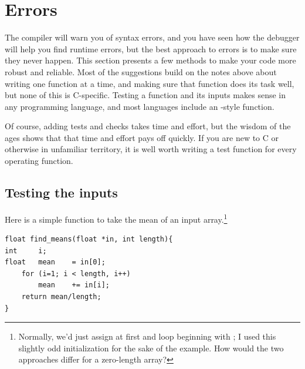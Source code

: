 
\section{\treesymbol Errors} The compiler will warn you of syntax
errors, and you have seen how the debugger will help you find runtime
errors, but the best approach to errors is to make sure they never
happen. This section presents a few methods to make your code more
robust and reliable. Most of the suggestions build on the notes above
about writing one function at a time, and making sure that function does
its task well, but
none of this is C-specific. Testing a function and its inputs makes
sense in any programming language, and most languages include an 
-style function.

Of course, adding tests and checks takes time and effort, but the
wisdom of the ages shows that that time and effort pays off quickly.
If you are new to C or otherwise in unfamiliar territory, it is well
worth writing a test function for every operating function.


\subsection{Testing the inputs} Here is a simple function to take the
mean of an input array.\footnote{Normally, we'd just assign
 at first and loop beginning with ; I used this slightly odd initialization
for the sake of the example. How would the two approaches differ for a
zero-length array?}
\begin{lstlisting}
float find_means(float *in, int length){
int     i;
float   mean    = in[0];
    for (i=1; i < length, i++)
        mean    += in[i];
    return mean/length;
}
\end{lstlisting}

